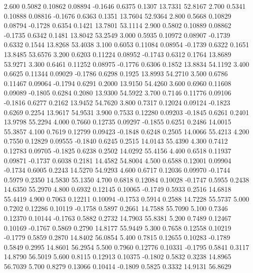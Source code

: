    2.600   0.5082   0.10862   0.08894  -0.1646   0.6375   0.1307  13.7331  52.8167
   2.700   0.5341   0.10888   0.08816  -0.1676   0.6363   0.1351  13.7604  52.9364
   2.800   0.5668   0.10829   0.08794  -0.1728   0.6354   0.1421  13.7801  53.1114
   2.900   0.5802   0.10889   0.08862  -0.1735   0.6342   0.1481  13.8042  53.2549
   3.000   0.5935   0.10972   0.08907  -0.1739   0.6332   0.1544  13.8268  53.4038
   3.100   0.6053   0.11084   0.08954  -0.1739   0.6322   0.1651  13.8485  53.6576
   3.200   0.6203   0.11224   0.08952  -0.1743   0.6312   0.1764  13.8689  53.9271
   3.300   0.6461   0.11252   0.08975  -0.1776   0.6306   0.1852  13.8834  54.1192
   3.400   0.6625   0.11344   0.09029  -0.1786   0.6298   0.1925  13.8993  54.2710
   3.500   0.6786   0.11467   0.09064  -0.1794   0.6291   0.2000  13.9150  54.4260
   3.600   0.6960   0.11608   0.09089  -0.1805   0.6284   0.2080  13.9300  54.5922
   3.700   0.7146   0.11776   0.09106  -0.1816   0.6277   0.2162  13.9452  54.7620
   3.800   0.7317   0.12024   0.09124  -0.1823   0.6269   0.2254  13.9617  54.9531
   3.900   0.7533   0.12280   0.09203  -0.1845   0.6261   0.2401  13.9798  55.2294
   4.000   0.7660   0.12735   0.09297  -0.1855   0.6251   0.2486  14.0015  55.3857
   4.100   0.7619   0.12799   0.09423  -0.1848   0.6248   0.2505  14.0066  55.4213
   4.200   0.7550   0.12829   0.09555  -0.1840   0.6245   0.2515  14.0143  55.4390
   4.300   0.7412   0.12783   0.09705  -0.1825   0.6238   0.2502  14.0292  55.4156
   4.400   0.6518   0.11937   0.09871  -0.1737   0.6038   0.2181  14.4582  54.8004
   4.500   0.6588   0.12001   0.09904  -0.1734   0.6005   0.2243  14.5270  54.9293
   4.600   0.6717   0.12036   0.09970  -0.1744   0.5979   0.2350  14.5830  55.1350
   4.700   0.6818   0.12084   0.10028  -0.1747   0.5955   0.2438  14.6350  55.2970
   4.800   0.6932   0.12145   0.10065  -0.1749   0.5933   0.2516  14.6818  55.4419
   4.900   0.7063   0.12211   0.10094  -0.1753   0.5914   0.2588  14.7228  55.5737
   5.000   0.7202   0.12286   0.10119  -0.1758   0.5897   0.2661  14.7588  55.7090
   5.100   0.7346   0.12370   0.10144  -0.1763   0.5882   0.2732  14.7903  55.8381
   5.200   0.7489   0.12467   0.10169  -0.1767   0.5869   0.2790  14.8177  55.9449
   5.300   0.7658   0.12558   0.10219  -0.1779   0.5859   0.2870  14.8402  56.0854
   5.400   0.7815   0.12655   0.10283  -0.1789   0.5849   0.2995  14.8601  56.2954
   5.500   0.7960   0.12776   0.10331  -0.1795   0.5841   0.3117  14.8790  56.5019
   5.600   0.8115   0.12913   0.10375  -0.1802   0.5832   0.3238  14.8965  56.7039
   5.700   0.8279   0.13066   0.10414  -0.1809   0.5825   0.3332  14.9131  56.8629
